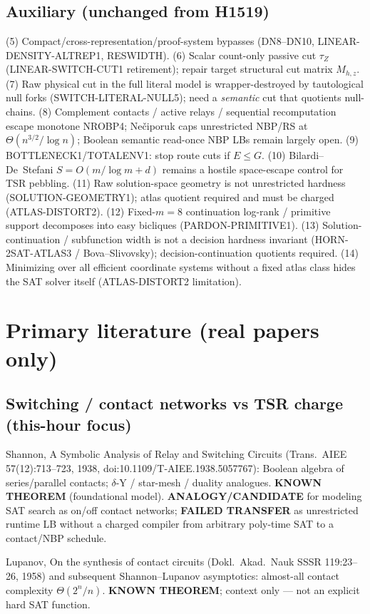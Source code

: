 \documentclass[11pt]{article}
\begin{document}
\subsection*{Auxiliary (unchanged from H1519)}
(5) Compact/cross-representation/proof-system bypasses (DN8--DN10, LINEAR-DENSITY-ALTREP1, RESWIDTH).
(6) Scalar count-only passive cut $\tau_Z$ (LINEAR-SWITCH-CUT1 retirement); repair target
structural cut matrix $M_{h,z}$.
(7) Raw physical cut in the full literal model is wrapper-destroyed by tautological
null forks (SWITCH-LITERAL-NULL5); need a \emph{semantic} cut that quotients null-chains.
(8) Complement contacts / active relays / sequential recomputation escape monotone NROBP4;
Ne\v{c}iporuk caps unrestricted NBP/RS at $\Theta(n^{3/2}/\log n)$; Boolean semantic
read-once NBP LBs remain largely open.
(9) BOTTLENECK1/TOTALENV1: stop route cuts if $E\le G$.
(10) Bilardi--De~Stefani $S=O(m/\log m+d)$ remains a hostile space-escape control for TSR pebbling.
(11) Raw solution-space geometry is not unrestricted hardness (SOLUTION-GEOMETRY1);
atlas quotient required and must be charged (ATLAS-DISTORT2).
(12) Fixed-$m=8$ continuation log-rank / primitive support decomposes into easy bicliques
(PARDON-PRIMITIVE1).
(13) Solution-continuation / subfunction width is not a decision hardness invariant
(HORN-2SAT-ATLAS3 / Bova--Slivovsky); decision-continuation quotients required.
(14) Minimizing over all efficient coordinate systems without a fixed atlas class
hides the SAT solver itself (ATLAS-DISTORT2 limitation).

\section*{Primary literature (real papers only)}
\subsection*{Switching / contact networks vs TSR charge (this-hour focus)}
Shannon, A Symbolic Analysis of Relay and Switching Circuits
(Trans.\ AIEE 57(12):713--723, 1938, doi:10.1109/T-AIEE.1938.5057767):
Boolean algebra of series/parallel contacts; $\delta$-Y / star-mesh / duality analogues.
\textbf{KNOWN THEOREM} (foundational model). \textbf{ANALOGY/CANDIDATE} for modeling
SAT search as on/off contact networks; \textbf{FAILED TRANSFER} as unrestricted runtime
LB without a charged compiler from arbitrary poly-time SAT to a contact/NBP schedule.

Lupanov, On the synthesis of contact circuits (Dokl.\ Akad.\ Nauk SSSR 119:23--26, 1958)
and subsequent Shannon--Lupanov asymptotics: almost-all contact complexity $\Theta(2^n/n)$.
\textbf{KNOWN THEOREM}; context only --- not an explicit hard SAT function.
\end{document}
